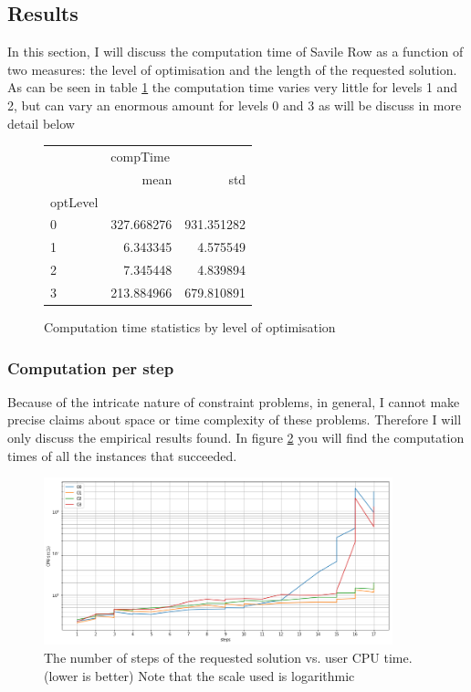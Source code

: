 \documentclass[british]{article}
\begin{document}
	\subsection{Results}
	In this section, I will discuss the computation time of Savile Row as a function of two measures: the level of optimisation and the length of the requested solution. As can be seen in table \ref{compstats} the computation time varies very little for levels 1 and 2, but can vary an enormous amount for levels 0 and 3 as will be discuss in more detail below 
	\begin{figure}[!h]
		\centering
		\begin{tabular}{lrr}
			\toprule
			{} & \multicolumn{2}{l}{compTime} \\
			{} &        mean &         std \\
			optLevel &             &             \\
			\midrule
			0        &  327.668276 &  931.351282 \\
			1        &    6.343345 &    4.575549 \\
			2        &    7.345448 &    4.839894 \\
			3        &  213.884966 &  679.810891 \\
			\bottomrule
		\end{tabular}
		\caption{Computation time statistics by level of optimisation}
		\label{compstats}	
		
	\end{figure}
	
	\subsubsection{Computation per step}
	Because of the intricate nature of constraint problems, in general, I cannot make precise claims about space or time complexity of these problems. Therefore I will only discuss the empirical results found. In figure \ref{stepsVsCPUSec} you will find the computation times of all the instances that succeeded.
	\FloatBarrier
	\begin{figure}[!ht]
		\centering
		\includegraphics[width=0.9\textwidth]{stepsVsCPUSec}
		\caption{The number of steps of the requested solution vs. user CPU time. (lower is better) Note that the scale used is logarithmic}
		\label{stepsVsCPUSec}	
	\end{figure}
	\FloatBarrier 
	
\end{document}
